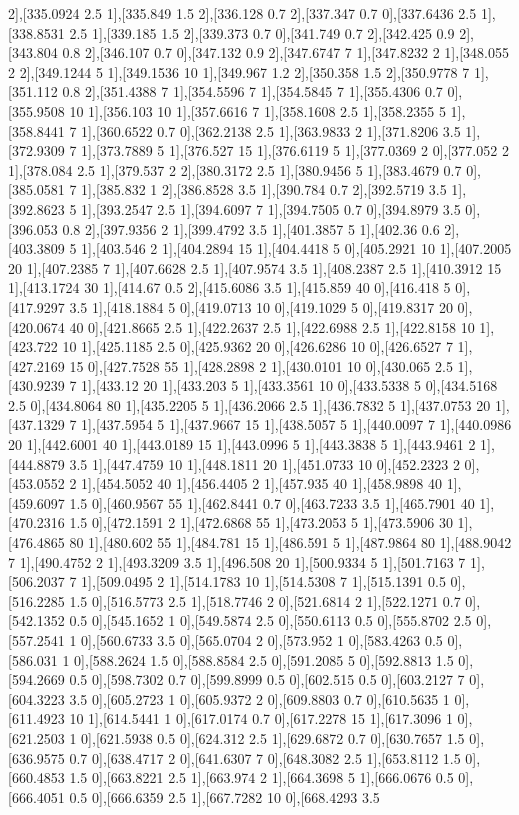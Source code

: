 {2],[335.0924 2.5 1],[335.849 1.5 2],[336.128 0.7 2],[337.347 0.7 0],[337.6436 2.5 1],[338.8531 2.5 1],[339.185 1.5 2],[339.373 0.7 0],[341.749 0.7 2],[342.425 0.9 2],[343.804 0.8 2],[346.107 0.7 0],[347.132 0.9 2],[347.6747 7 1],[347.8232 2 1],[348.055 2 2],[349.1244 5 1],[349.1536 10 1],[349.967 1.2 2],[350.358 1.5 2],[350.9778 7 1],[351.112 0.8 2],[351.4388 7 1],[354.5596 7 1],[354.5845 7 1],[355.4306 0.7 0],[355.9508 10 1],[356.103 10 1],[357.6616 7 1],[358.1608 2.5 1],[358.2355 5 1],[358.8441 7 1],[360.6522 0.7 0],[362.2138 2.5 1],[363.9833 2 1],[371.8206 3.5 1],[372.9309 7 1],[373.7889 5 1],[376.527 15 1],[376.6119 5 1],[377.0369 2 0],[377.052 2 1],[378.084 2.5 1],[379.537 2 2],[380.3172 2.5 1],[380.9456 5 1],[383.4679 0.7 0],[385.0581 7 1],[385.832 1 2],[386.8528 3.5 1],[390.784 0.7 2],[392.5719 3.5 1],[392.8623 5 1],[393.2547 2.5 1],[394.6097 7 1],[394.7505 0.7 0],[394.8979 3.5 0],[396.053 0.8 2],[397.9356 2 1],[399.4792 3.5 1],[401.3857 5 1],[402.36 0.6 2],[403.3809 5 1],[403.546 2 1],[404.2894 15 1],[404.4418 5 0],[405.2921 10 1],[407.2005 20 1],[407.2385 7 1],[407.6628 2.5 1],[407.9574 3.5 1],[408.2387 2.5 1],[410.3912 15 1],[413.1724 30 1],[414.67 0.5 2],[415.6086 3.5 1],[415.859 40 0],[416.418 5 0],[417.9297 3.5 1],[418.1884 5 0],[419.0713 10 0],[419.1029 5 0],[419.8317 20 0],[420.0674 40 0],[421.8665 2.5 1],[422.2637 2.5 1],[422.6988 2.5 1],[422.8158 10 1],[423.722 10 1],[425.1185 2.5 0],[425.9362 20 0],[426.6286 10 0],[426.6527 7 1],[427.2169 15 0],[427.7528 55 1],[428.2898 2 1],[430.0101 10 0],[430.065 2.5 1],[430.9239 7 1],[433.12 20 1],[433.203 5 1],[433.3561 10 0],[433.5338 5 0],[434.5168 2.5 0],[434.8064 80 1],[435.2205 5 1],[436.2066 2.5 1],[436.7832 5 1],[437.0753 20 1],[437.1329 7 1],[437.5954 5 1],[437.9667 15 1],[438.5057 5 1],[440.0097 7 1],[440.0986 20 1],[442.6001 40 1],[443.0189 15 1],[443.0996 5 1],[443.3838 5 1],[443.9461 2 1],[444.8879 3.5 1],[447.4759 10 1],[448.1811 20 1],[451.0733 10 0],[452.2323 2 0],[453.0552 2 1],[454.5052 40 1],[456.4405 2 1],[457.935 40 1],[458.9898 40 1],[459.6097 1.5 0],[460.9567 55 1],[462.8441 0.7 0],[463.7233 3.5 1],[465.7901 40 1],[470.2316 1.5 0],[472.1591 2 1],[472.6868 55 1],[473.2053 5 1],[473.5906 30 1],[476.4865 80 1],[480.602 55 1],[484.781 15 1],[486.591 5 1],[487.9864 80 1],[488.9042 7 1],[490.4752 2 1],[493.3209 3.5 1],[496.508 20 1],[500.9334 5 1],[501.7163 7 1],[506.2037 7 1],[509.0495 2 1],[514.1783 10 1],[514.5308 7 1],[515.1391 0.5 0],[516.2285 1.5 0],[516.5773 2.5 1],[518.7746 2 0],[521.6814 2 1],[522.1271 0.7 0],[542.1352 0.5 0],[545.1652 1 0],[549.5874 2.5 0],[550.6113 0.5 0],[555.8702 2.5 0],[557.2541 1 0],[560.6733 3.5 0],[565.0704 2 0],[573.952 1 0],[583.4263 0.5 0],[586.031 1 0],[588.2624 1.5 0],[588.8584 2.5 0],[591.2085 5 0],[592.8813 1.5 0],[594.2669 0.5 0],[598.7302 0.7 0],[599.8999 0.5 0],[602.515 0.5 0],[603.2127 7 0],[604.3223 3.5 0],[605.2723 1 0],[605.9372 2 0],[609.8803 0.7 0],[610.5635 1 0],[611.4923 10 1],[614.5441 1 0],[617.0174 0.7 0],[617.2278 15 1],[617.3096 1 0],[621.2503 1 0],[621.5938 0.5 0],[624.312 2.5 1],[629.6872 0.7 0],[630.7657 1.5 0],[636.9575 0.7 0],[638.4717 2 0],[641.6307 7 0],[648.3082 2.5 1],[653.8112 1.5 0],[660.4853 1.5 0],[663.8221 2.5 1],[663.974 2 1],[664.3698 5 1],[666.0676 0.5 0],[666.4051 0.5 0],[666.6359 2.5 1],[667.7282 10 0],[668.4293 3.5 }
